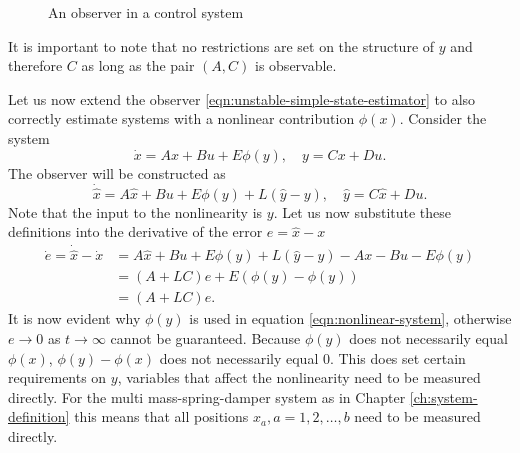 \begin{figure}[ht]
    \centering
    \caption{An observer in a control system}
    \label{fig:observer-diagram}
\end{figure}

It is important to note that no restrictions are set on the structure of $y$ and therefore $C$ as long as the pair $(A,C)$ is observable. 

Let us now extend the observer \eqref{eqn:unstable-simple-state-estimator} to also correctly estimate systems with a nonlinear contribution $\phi(x)$. Consider the system
\begin{equation*}\label{eqn:nonlinear-system}
    \dot{x} = Ax + Bu + E\phi(y), \quad y = Cx + Du.
\end{equation*}
The observer will be constructed as
\begin{equation}
    \dot{\hat{x}} = A\hat{x} + Bu + E\phi(y) + L(\hat{y} - y), \quad \hat{y} = C\hat{x} + Du.
\end{equation}
Note that the input to the nonlinearity is $y$. Let us now substitute these definitions into the derivative of the error $e=\hat{x}-x$
\begin{equation*}\label{eqn:errror-nonlinear-observer}
    \begin{split}
        \dot{e} = \dot{\hat{x}} - \dot{x} &= A\hat{x} + Bu + E\phi(y) + L(\hat{y} - y) - Ax - Bu - E\phi(y) \\
        &= (A+LC)e + E(\phi(y) - \phi(y)) \\
        &= (A+LC)e.
    \end{split}
\end{equation*}
It is now evident why $\phi(y)$ is used in equation \eqref{eqn:nonlinear-system}, otherwise $e \rightarrow 0$ as $t \rightarrow \infty$ cannot be guaranteed. Because $\phi(y)$ does not necessarily equal $\phi(x)$, $\phi(y) - \phi(x)$ does not necessarily equal $0$. This does set certain requirements on $y$, variables that affect the nonlinearity need to be measured directly. For the multi mass-spring-damper system as in Chapter \ref{ch:system-definition} this means that all positions $x_a,a=1,2,\dots,b$ need to be measured directly. \\

